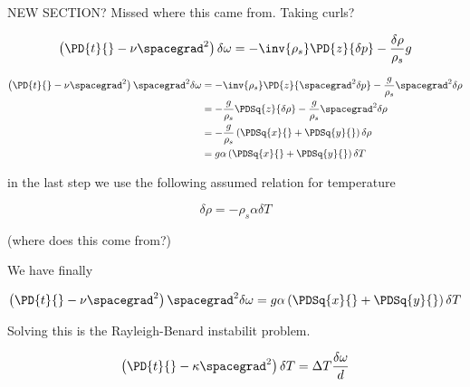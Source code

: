 NEW SECTION?  Missed where this came from.  Taking curls?

\begin{equation}\label{eqn:continuumL21:230}
\left( \PD{t}{} - \nu \spacegrad^2 \right) \delta \omega = -\inv{\rho_s} \PD{z}{\delta p} - \frac{\delta \rho}{\rho_s} g
\end{equation}

\begin{align*}
\left( \PD{t}{} - \nu \spacegrad^2 \right) \spacegrad^2 \delta \omega 
&= -\inv{\rho_s} \PD{z}{ \spacegrad^2 \delta p} - \frac{g}{\rho_s} \spacegrad^2 \delta \rho \\
&= -\frac{g}{\rho_s} \PDSq{z}{\delta \rho} - \frac{g}{\rho_s} \spacegrad^2 \delta \rho \\
&= 
-\frac{g}{\rho_s} \left( 
\PDSq{x}{}
+\PDSq{y}{}
\right)
\delta \rho \\
&=
g \alpha \left( 
\PDSq{x}{}
+\PDSq{y}{}
\right)
\delta T
\end{align*}

in the last step we use the following assumed relation for temperature

\begin{equation}\label{eqn:continuumL21:250}
\delta \rho = - \rho_s \alpha \delta T
\end{equation}

(where does this come from?)

We have finally

\begin{equation}\label{eqn:continuumL21:290}
\left( \PD{t}{} - \nu \spacegrad^2 \right) \spacegrad^2 \delta \omega 
= 
g \alpha \left( 
\PDSq{x}{}
+\PDSq{y}{}
\right)
\delta T
\end{equation}

Solving this is the Rayleigh-Benard instabilit problem.

\begin{equation}\label{eqn:continuumL21:270}
\left( \PD{t}{} - \kappa \spacegrad^2 \right) \delta T = \Delta T \frac{\delta \omega}{d}
\end{equation}



\EndNoBibArticle
